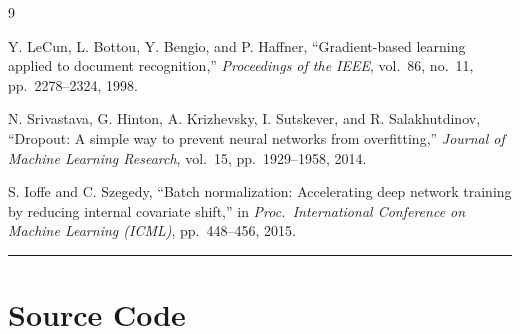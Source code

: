 \documentclass[11pt]{article}
\begin{document}
\begin{thebibliography}{9}

Y. LeCun, L. Bottou, Y. Bengio, and P. Haffner,
``Gradient-based learning applied to document recognition,''
\textit{Proceedings of the IEEE}, vol.\ 86, no.\ 11, pp.\ 2278--2324, 1998.

N. Srivastava, G. Hinton, A. Krizhevsky, I. Sutskever, and R. Salakhutdinov,
``Dropout: A simple way to prevent neural networks from overfitting,''
\textit{Journal of Machine Learning Research}, vol.\ 15, pp.\ 1929--1958, 2014.

S. Ioffe and C. Szegedy,
``Batch normalization: Accelerating deep network training by reducing internal covariate shift,''
in \textit{Proc.\ International Conference on Machine Learning (ICML)}, pp.\ 448--456, 2015.

\end{thebibliography}

\vspace{0.5cm}
\hrule
\vspace{0.5cm}

\appendix
\section{Source Code}


\end{document}
